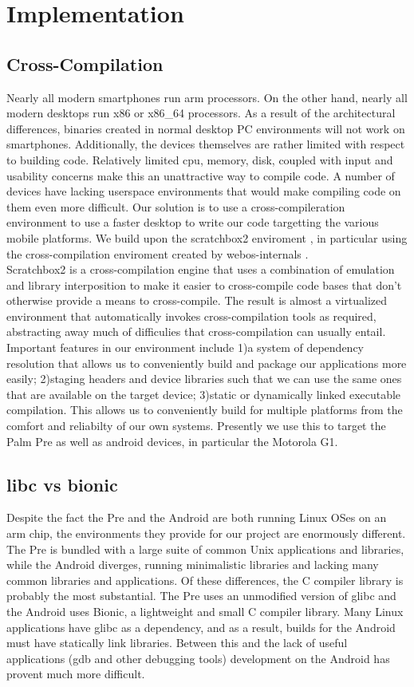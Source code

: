 \section{Implementation}
\label{sec:impl}
\subsection{Cross-Compilation}
Nearly all modern smartphones run arm processors.  On the other hand, nearly all modern desktops run x86 or x86\_64 processors. As a result of the architectural differences, binaries created in normal desktop PC environments will not work on smartphones. Additionally, the devices themselves are rather limited with respect to building code.  Relatively limited cpu, memory, disk, coupled with input and usability concerns make this an unattractive way to compile code.  A number of devices have lacking userspace environments that would make compiling code on them even more difficult.
Our solution is to use a cross-compileration environment to use a faster desktop to write our code targetting the various mobile platforms.
We build upon the scratchbox2 enviroment \cite{sb2}, in particular using the cross-compilation enviroment created by webos-internals \cite{webosinterals}.\\
Scratchbox2 is a cross-compilation engine that uses a combination of emulation and library interposition to make it easier to cross-compile code bases that don't otherwise provide a means to cross-compile.
The result is almost a virtualized environment that automatically invokes cross-compilation tools as required, abstracting away much of difficulies that cross-compilation can usually entail.
Important features in our environment include 1)a system of dependency resolution that allows us to conveniently build and package our applications more easily; 2)staging headers and device libraries such that we can use the same ones that are available on the target device; 3)static or dynamically linked executable compilation.
This allows us to conveniently build for multiple platforms from the comfort and reliabilty of our own systems.  Presently we use this to target the Palm Pre as well as android devices, in particular the Motorola G1.

\subsection{libc vs bionic}
Despite the fact the Pre and the Android are both running Linux OSes on an arm chip, the environments they provide for our project are enormously different.  The Pre is bundled with a large suite of common Unix applications and libraries, while the Android diverges, running minimalistic libraries and lacking many common libraries and applications.  Of these differences, the C compiler library is probably the most substantial. The Pre uses an unmodified version of glibc and the Android uses Bionic, a lightweight and small C compiler library.  Many Linux applications have glibc as a dependency, and as a result, builds for the Android must have statically link libraries.  Between this and the lack of useful applications (gdb and other debugging tools) development on the Android has provent much more difficult.  

